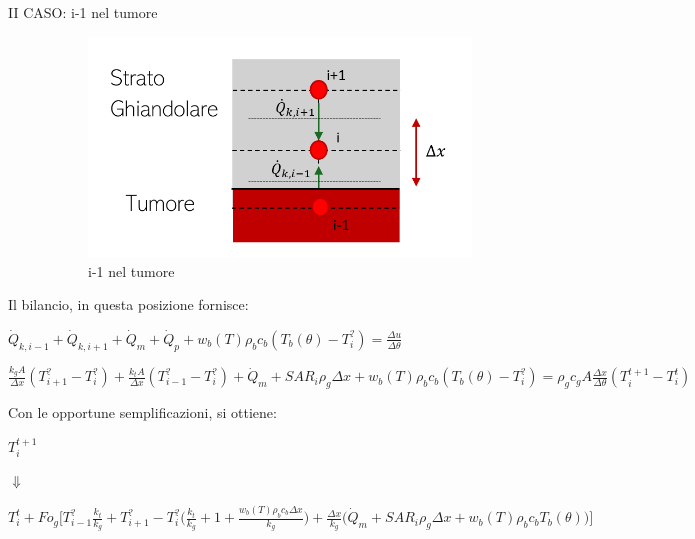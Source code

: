 \begin{description}
\item[II CASO: i-1 nel tumore]

     \begin{figure}[H]
    \centering
    \includegraphics[width=.6\textwidth]{Immagini/Nodi/nodo11.2.png} 
    \caption{i-1 nel tumore}
    \label{nodo8.2}
\end{figure}
\end{description}
Il bilancio, in questa posizione fornisce:
\begin{center}
	$ \Dot{Q} _{k, i-1} +\Dot{Q} _{k, i+1}+ \Dot{Q} _{m} +\Dot{Q} _{p}+ w_b (T) \rho _b c_b (T_b(\theta)-T_i ^?)= \frac{\Delta u}{\Delta \theta} $
\end{center}
\vspace{0.15cm}
\begin{center}
	$ \frac{k_{g} A }{\Delta x}(T_{i+1} ^? - T_i ^? ) + \frac{k_t A }{\Delta x}(T_{i-1} ^? - T_i ^? )+ \Dot{Q} _{m} + SAR_i\rho _g \Delta x + w_b (T) \rho _b c_b (T_b(\theta)-T_i ^?) = \rho _{g} c_{g} A \frac{\Delta x}{ \Delta \theta}(T_i ^{t+1} - T_i ^t ) $
\end{center}
Con le opportune semplificazioni, si ottiene:
\begin{center}
	$T_i ^{t+1} $
\end{center}
\begin{center}
	$\Downarrow$
\end{center}
\begin{center}
	$T_i ^t + Fo_{g} \Bigg[ T_{i-1} ^? \frac{k_{t}}{k_g} + T_{i+1} ^?- T_i ^? \Big(\frac{k_{t}}{k_g} + 1 + \frac{ w_b (T) \rho _b c_b \Delta x }{k_{g}} \Big) + \frac{\Delta x }{k_{g}} \Big(\Dot{Q} _{m} +  SAR_i \rho _{g} \Delta x + w_b (T) \rho _b c_b T_b(\theta)\Big) \Bigg]$
\end{center}
